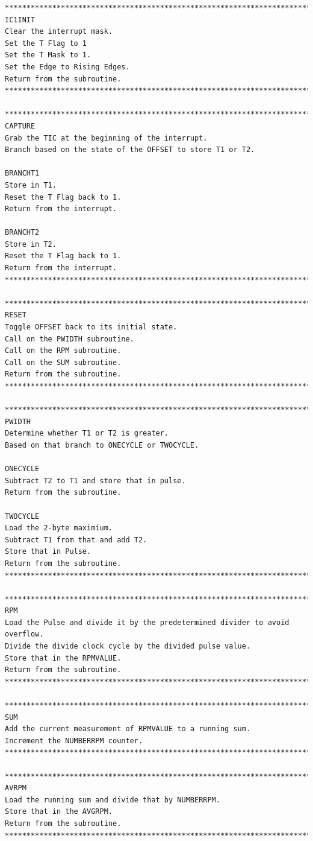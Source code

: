 \documentclass[12pt]{report}
\begin{document}
\begin{Verbatim}[frame=single, fontsize=\footnotesize]
****************************************************************************************
IC1INIT
Clear the interrupt mask.
Set the T Flag to 1
Set the T Mask to 1.
Set the Edge to Rising Edges.
Return from the subroutine.
****************************************************************************************

****************************************************************************************
CAPTURE
Grab the TIC at the beginning of the interrupt.
Branch based on the state of the OFFSET to store T1 or T2.

BRANCHT1
Store in T1.
Reset the T Flag back to 1.
Return from the interrupt.

BRANCHT2
Store in T2.
Reset the T Flag back to 1.
Return from the interrupt.
****************************************************************************************

*********************************************************************************
RESET
Toggle OFFSET back to its initial state.
Call on the PWIDTH subroutine.
Call on the RPM subroutine.
Call on the SUM subroutine.
Return from the subroutine.
*********************************************************************************

*********************************************************************************
PWIDTH
Determine whether T1 or T2 is greater.
Based on that branch to ONECYCLE or TWOCYCLE.

ONECYCLE
Subtract T2 to T1 and store that in pulse.
Return from the subroutine.

TWOCYCLE
Load the 2-byte maximium.
Subtract T1 from that and add T2.
Store that in Pulse.
Return from the subroutine.
*********************************************************************************

*********************************************************************************
RPM
Load the Pulse and divide it by the predetermined divider to avoid overflow.
Divide the divide clock cycle by the divided pulse value.
Store that in the RPMVALUE.
Return from the subroutine.
*********************************************************************************

*********************************************************************************
SUM
Add the current measurement of RPMVALUE to a running sum.
Increment the NUMBERRPM counter.
*********************************************************************************

*********************************************************************************
AVRPM
Load the running sum and divide that by NUMBERRPM.
Store that in the AVGRPM.
Return from the subroutine.
*********************************************************************************


\end{Verbatim}
\end{document}

